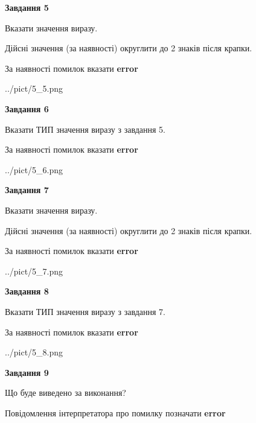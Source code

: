 \documentclass[11pt, ukrainian]{article}
\begin{document}
{\begin {large}
{\begin {center}\textbf{Завдання 5}\end {center}}\par
Вказати значення виразу. \par
Дійсні значення (за наявності) округлити до 2 знаків після крапки. \par
За наявності помилок вказати \textbf{error}

\begin{center}
	{../pict/5_5.png}
\end{center}
\newpage

{\begin {center}\textbf{Завдання 6}\end {center}}\par
Вказати ТИП значення виразу з завдання 5. \par
За наявності помилок вказати \textbf{error}

\begin{center}
	{../pict/5_6.png}
\end{center}
\newpage

{\begin {center}\textbf{Завдання 7}\end {center}}\par
Вказати значення виразу. \par
Дійсні значення (за наявності) округлити до 2 знаків після крапки. \par
За наявності помилок вказати \textbf{error}

\begin{center}
	{../pict/5_7.png}
\end{center}
\newpage

{\begin {center}\textbf{Завдання 8}\end {center}}\par
Вказати ТИП значення виразу з завдання 7. \par
За наявності помилок вказати \textbf{error}

\begin{center}
	{../pict/5_8.png}
\end{center}
\newpage

{\begin {center}\textbf{Завдання 9}\end {center}}\par
Що буде виведено за виконання? \par
Повідомлення інтерпретатора про помилку позначати \textbf{error}


\end{large}}
\end{document}
